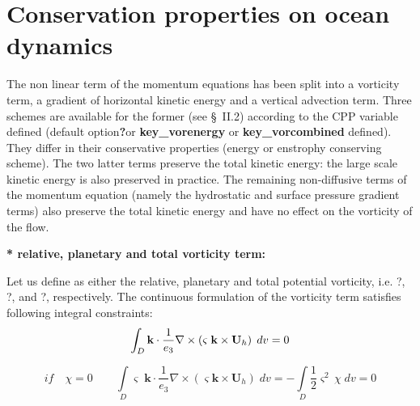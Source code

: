 \documentclass[../tex_main/NEMO_manual]{subfiles}
\begin{document}
\section{Conservation properties on ocean dynamics}
\label{sec:Invariant_dyn}

The non linear term of the momentum equations has been split into a vorticity term,
a gradient of horizontal kinetic energy and a vertical advection term.
Three schemes are available for the former (see {\S}~II.2) according to the CPP variable defined
(default option\textbf{?}or \textbf{key{\_}vorenergy} or \textbf{key{\_}vorcombined} defined).
They differ in their conservative properties (energy or enstrophy conserving scheme).
The two latter terms preserve the total kinetic energy:
the large scale kinetic energy is also preserved in practice.
The remaining non-diffusive terms of the momentum equation
(namely the hydrostatic and surface pressure gradient terms) also preserve the total kinetic energy and
have no effect on the vorticity of the flow.

\textbf{* relative, planetary and total vorticity term:}

Let us define as either the relative, planetary and total potential vorticity, i.e. ?, ?, and ?, respectively.
The continuous formulation of the vorticity term satisfies following integral constraints:
\begin{equation} \label{eq:vor_vorticity}
\int_D {{\textbf {k}}\cdot \frac{1}{e_3 }\nabla \times \left( {\varsigma 
\;{\rm {\bf k}}\times {\textbf {U}}_h } \right)\;dv} =0
\end{equation}

\begin{equation} \label{eq:vor_enstrophy}
if\quad \chi =0\quad \quad \int\limits_D {\varsigma \;{\textbf{k}}\cdot 
\frac{1}{e_3 }\nabla \times \left( {\varsigma {\textbf{k}}\times {\textbf{U}}_h } \right)\;dv} =-\int\limits_D {\frac{1}{2}\varsigma ^2\,\chi \;dv} 
=0
\end{equation}
\end{document}
